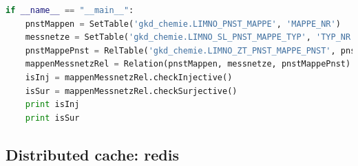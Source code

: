 \begin{lstlisting}[language=python]
if __name__ == "__main__":
    pnstMappen = SetTable('gkd_chemie.LIMNO_PNST_MAPPE', 'MAPPE_NR')
    messnetze = SetTable('gkd_chemie.LIMNO_SL_PNST_MAPPE_TYP', 'TYP_NR')
    pnstMappePnst = RelTable('gkd_chemie.LIMNO_ZT_PNST_MAPPE_PNST', pnstMappen, 'MAPPE_NR', messnetze, 'MN_NR')
    mappenMessnetzRel = Relation(pnstMappen, messnetze, pnstMappePnst)
    isInj = mappenMessnetzRel.checkInjective()
    isSur = mappenMessnetzRel.checkSurjective()
    print isInj
    print isSur

\end{lstlisting}



\subsection{Distributed cache: redis}

